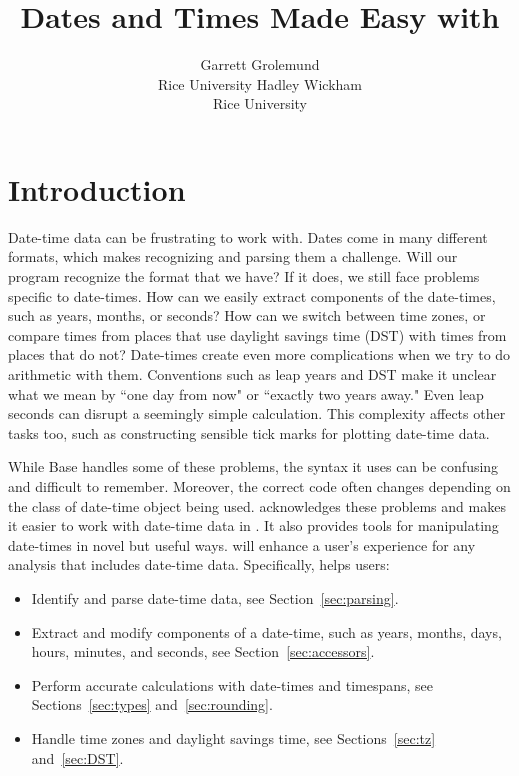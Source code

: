 \documentclass[article]{jss}
\author{Garrett Grolemund\\Rice University \And
        Hadley Wickham\\Rice University}
\title{Dates and Times Made Easy with \pkg{lubridate}}
\begin{document}
\section{Introduction}

Date-time data can be frustrating to work with. Dates come in many different formats, which makes recognizing and parsing them a challenge. Will our program recognize the format that we have? If it does, we still face problems specific to date-times. How can we easily extract components of the date-times, such as years, months, or seconds? How can we switch between time zones, or compare times from places that use daylight savings time (DST) with times from places that do not? Date-times create even more complications when we try to do arithmetic with them. Conventions such as leap years and DST make it unclear what we mean by ``one day from now" or ``exactly two years away."  Even leap seconds can disrupt a seemingly simple calculation.  This complexity affects other tasks too, such as constructing sensible tick marks for plotting date-time data.

While Base  \citep{R} handles some of these problems, the syntax it uses can be confusing and difficult to remember. Moreover, the correct  code often changes depending on the class of date-time object being used.  acknowledges these problems and makes it easier to work with date-time data in . It also provides tools for manipulating date-times in novel but useful ways.  will enhance a user's experience for any analysis that includes date-time data. Specifically,  helps users:

\begin{itemize}
   \item Identify and parse date-time data, see Section~\ref{sec:parsing}.

    \item Extract and modify components of a date-time, such as years, months, days, hours, minutes, and seconds, see Section~\ref{sec:accessors}.

  \item Perform accurate calculations with date-times and timespans, see Sections~\ref{sec:types} and~\ref{sec:rounding}.

  \item Handle time zones and daylight savings time, see Sections~\ref{sec:tz} and~\ref{sec:DST}.

\end{itemize}
\end{document}

